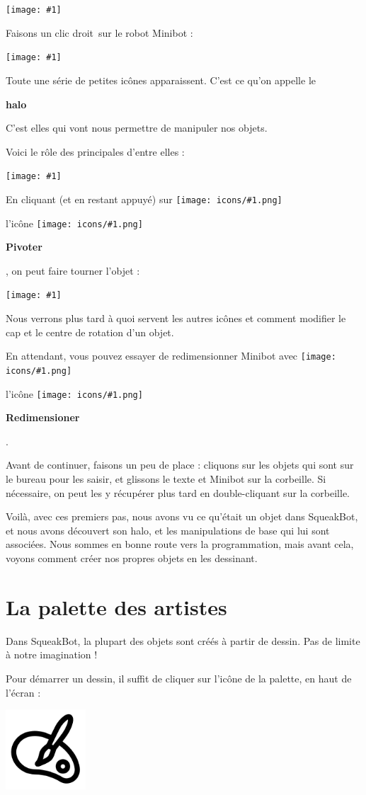 \documentclass[a4paper,12pt]{book}
\def\appName{SqueakBot}
\def\cd{clic droit~}
\newcommand{\capture}[1]
{
\begin{center}
	\texttt{[image: \#1]}
\end{center}
}
\newcommand{\important}[1]
{
\textbf{#1}
}
\newcommand{\motcle}[2]
{
\important{\gls{#1}}
}
\newcommand{\inserticon}[1]
{
\texttt{[image: icons/\#1.png]}
}
\newcommand{\icon}[2][]
{
\ifthenelse {\equal{#1} {}} {\inserticon{#2}} {l'icône \inserticon{#2} \important{#1}}
}
\newcommand{\afaire}[1]
{
#1
}
\begin{document}
\capture{2.png}

Faisons un \cd sur le robot Minibot :
\capture{1.png}

Toute une série de petites icônes apparaissent. C'est ce qu'on appelle le \motcle{halo}. C'est elles qui vont nous permettre de manipuler nos objets.

Voici le rôle des principales d'entre elles :

\capture{3.png}

En cliquant (et en restant appuyé) sur\icon[Pivoter]{pivoter}, on peut faire tourner l'objet :

\capture{4.png}

Nous verrons plus tard à quoi servent les autres icônes et comment modifier le cap et le centre de rotation d'un objet.

\afaire{
En attendant, vous pouvez essayer de redimensionner Minibot avec \icon[Redimensioner]{redimensionner}.
}

Avant de continuer, faisons un peu de place : cliquons sur les objets qui sont sur le bureau pour les saisir, et glissons le texte et Minibot sur la corbeille. Si nécessaire, on peut les y récupérer plus tard en double-cliquant sur la corbeille.

Voilà, avec ces premiers pas, nous avons vu ce qu'était un objet dans \appName, et nous avons découvert son halo, et les manipulations de base qui lui sont associées. Nous sommes en bonne route vers la programmation, mais avant cela, voyons comment créer nos propres objets en les dessinant.

\section{La palette des artistes}

Dans \appName, la plupart des objets sont créés à partir de dessin. Pas de limite à notre imagination !

Pour démarrer un dessin, il suffit de cliquer sur l'icône de la palette, en haut de l'écran :

\begin{center}
    \includegraphics[width=3cm]{palette.png}
\end{center}
\end{document}
